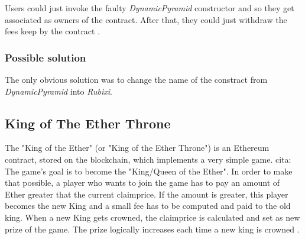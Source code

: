 Users could just invoke the faulty \textit{DynamicPyramid} constructor and so they get associated as owners of the contract. After that, they could just withdraw the fees keep by the contract \cite{rubixi1}. 

\subsubsection{Possible solution}
The only obvious solution was to change the name of the constract from \textit{DynamicPyramid} into \textit{Rubixi}.


\subsection{King of The Ether Throne}
The "King of the Ether" (or "King of the Ether Throne") is an Ethereum contract, stored on the blockchain, which implements a very simple game. cita: %
The game's goal is to become the "King/Queen of the Ether". In order to make that possible, a player who wants to join the game has to pay an amount of Ether greater that the current claimprice. If the amount is greater, this player becomes the new King and a small fee has to be computed and paid to the old king. 
When a new King gets crowned, the claimprice is calculated and set as new prize of the game. The prize logically increases each time a new king is crowned \cite{paper2}. \\

